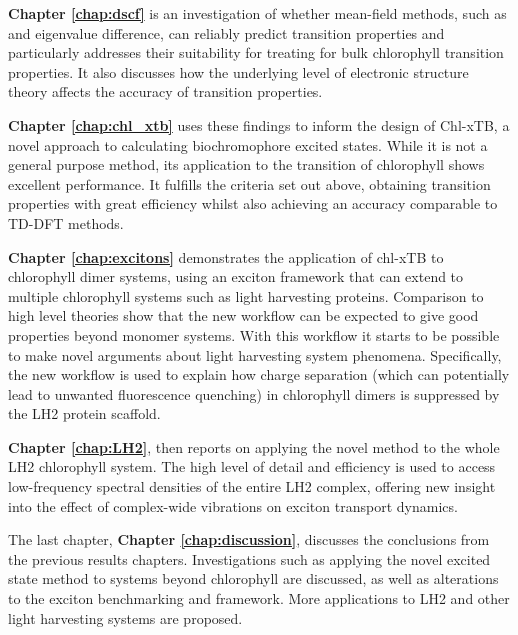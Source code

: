 \textbf{Chapter \ref{chap:dscf}} is an investigation of whether mean-field methods,
such as \dscf and eigenvalue difference, can reliably predict transition properties 
and particularly addresses their suitability for treating for bulk chlorophyll transition
properties. It also discusses how the underlying level of electronic structure theory
affects the accuracy of transition properties.

\textbf{Chapter \ref{chap:chl_xtb}} uses these findings to inform the design of 
Chl-xTB, a novel approach to calculating biochromophore excited states. While it
is not a general purpose method, its application to the \Qy transition of chlorophyll 
shows excellent performance. It fulfills the criteria set out above, obtaining transition
properties with great efficiency whilst also achieving an accuracy comparable to 
TD-DFT methods.

\textbf{Chapter \ref{chap:excitons}} demonstrates the application of chl-xTB to chlorophyll 
dimer systems, using an exciton framework that can extend to multiple chlorophyll
systems such as light harvesting proteins. Comparison to high level theories show 
that the new workflow can be expected to give good properties beyond monomer systems. 
With this workflow it starts to be possible to make novel arguments about light 
harvesting system phenomena. Specifically, the new workflow is used to explain how
charge separation (which can potentially lead to unwanted fluorescence quenching) 
in chlorophyll dimers is suppressed by the LH2 protein scaffold.

\textbf{Chapter \ref{chap:LH2}}, then reports on applying the novel method to the
whole LH2 chlorophyll system. The high level of detail and efficiency is used to 
access low-frequency spectral densities of the entire LH2 complex, offering new
insight into the effect of complex-wide vibrations on exciton transport dynamics.

The last chapter, \textbf{Chapter \ref{chap:discussion}}, discusses the conclusions
from the previous results chapters. Investigations such as applying the novel excited 
state method to systems beyond chlorophyll are discussed, as well as alterations 
to the exciton benchmarking and framework. More applications to LH2 and other light 
harvesting systems are proposed.


